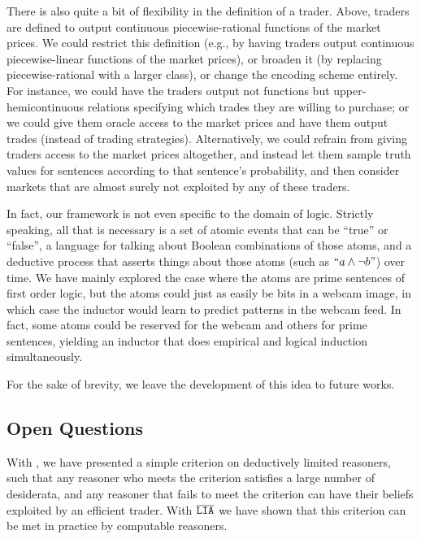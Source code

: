 \documentclass[authordate,onecolumn,noenvironments]{miri-tech-article}
\numberwithin{equation}{subsection}
\newcommand{\quot}[1]{``#1"}
\newcommand{\seq}[1]{{\overline{#1}}}
\newcommand{\LIA}{\text{\upshape{\texttt{LIA}}}\xspace}
\begin{document}
There is also quite a bit of flexibility in the definition of a trader. Above, traders are defined to output continuous piecewise-rational functions of the market prices. We could restrict this definition (e.g., by having traders output continuous piecewise-linear functions of the market prices), or broaden it (by replacing piecewise-rational with a larger class), or change the encoding scheme entirely. For instance, we could have the traders output not functions but upper-hemicontinuous relations specifying which trades they are willing to purchase; or we could give them oracle access to the market prices and have them output trades (instead of trading strategies). Alternatively, we could refrain from giving traders access to the market prices altogether, and instead let them sample truth values for sentences according to that sentence's probability, and then consider markets that are almost surely not exploited by any of these traders.

In fact, our framework is not even specific to the domain of logic. Strictly speaking, all that is necessary is a set of atomic events that can be ``true'' or ``false'', a language for talking about Boolean combinations of those atoms, and a deductive process that asserts things about those atoms (such as $\quot{a \land \lnot b}$) over time. We have mainly explored the case where the atoms are prime sentences of first order logic, but the atoms could just as easily be bits in a webcam image, in which case the inductor would learn to predict patterns in the webcam feed. In fact, some atoms could be reserved for the webcam and others for prime sentences, yielding an inductor that does empirical and logical induction simultaneously.

For the sake of brevity, we leave the development of this idea to future works.

%
%
%
%
%
%
%
%
%
%
%
%
%
%
%
%
%
\subsection{Open Questions}\label{sec:openquestions}

With , we have presented a simple criterion on deductively limited reasoners, such that any reasoner who meets the criterion satisfies a large number of desiderata, and any reasoner that fails to meet the criterion can have their beliefs exploited by an efficient trader. With $\seq\LIA$ we have shown that this criterion can be met in practice by computable reasoners.
\end{document}
